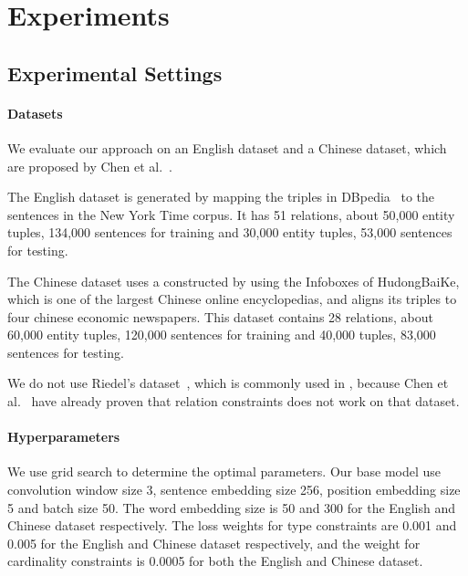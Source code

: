 \section{Experiments}

\subsection{Experimental Settings}
\paragraph{Datasets}
We evaluate our approach on an English dataset and a Chinese dataset, which are proposed by Chen et al.~.


The English dataset is generated by mapping the triples in DBpedia~\cite{bizer2009dbpedia} to the sentences in the New York Time corpus. It has 51 relations, about 50,000 entity tuples, 134,000 sentences for training and 30,000 entity tuples, 53,000 sentences for testing.

The Chinese dataset uses a \KB constructed by using the Infoboxes of HudongBaiKe, which is one of the largest Chinese online encyclopedias, and aligns its triples to  four chinese economic newspapers.
This dataset contains 28 relations, about 60,000 entity tuples, 120,000 sentences for training and 40,000 tuples, 83,000 sentences for testing.

We do not use Riedel's dataset~\cite{riedel2010modeling}, which is commonly used in \RE, because  Chen et al.~ have already proven that relation constraints does not work on that dataset.


\paragraph{Hyperparameters}
We use grid search to determine the optimal parameters.
Our base model use convolution window size 3, sentence embedding size 256, position embedding size 5 and batch size 50.
The word embedding size is 50 and 300 for the English and Chinese dataset respectively.
The loss weights for type constraints are 0.001 and 0.005 for the English and Chinese dataset respectively, 
and the weight for cardinality constraints is 0.0005 for both the English and Chinese dataset.

